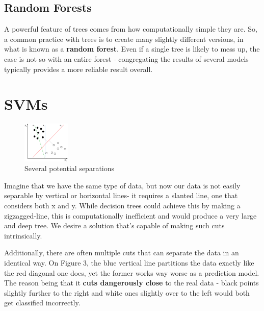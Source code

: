 \documentclass{article}
\begin{document}
\subsection{Random Forests}
A powerful feature of trees comes from how computationally simple they are. So, a common practice with trees is to create many slightly different versions, in what is known as a \textbf{random forest}. Even if a single tree is likely to mess up, the case is not so with an entire forest - congregating the results of several models typically provides a more reliable result overall.

\section{SVMs}
\begin{figure}
  \begin{center}
    \vspace{-35pt}
    \includegraphics[width=0.2\textwidth]{SVMseparate.png}
    \vspace{-30pt}
  \end{center}
  \caption{Several potential separations}
  \vspace{-10pt}
\end{figure}
Imagine that we have the same type of data, but now our data is not easily separable by vertical or horizontal lines-  it requires a slanted line, one that considers both x and y. While decision trees could achieve this by making a zigzagged-line, this is computationally inefficient and would produce a very large and deep tree. We desire a solution that's capable of making such cuts intrinsically.

Additionally, there are often multiple cuts that can separate the data in an identical way. On Figure 3, the blue vertical line partitions the data exactly like the red diagonal one does, yet the former works way worse as a prediction model. The reason being that it \textbf{cuts dangerously close} to the real data - black points slightly further to the right and white ones slightly over to the left would both get classified incorrectly.
\end{document}
